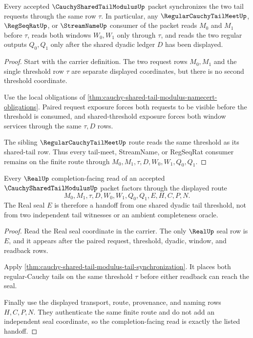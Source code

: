 \begin{theorem}
\label{thm:cauchy-shared-tail-modulus-tail-synchronization}
Every accepted $\CauchySharedTailModulusUp$ packet synchronizes the two tail requests through the same row $\tau$. In particular, any $\RegularCauchyTailMeetUp$, $\RegSeqRatUp$, or $\StreamNameUp$ consumer of the packet reads $M_0$ and $M_1$ before $\tau$, reads both windows $W_0,W_1$ only through $\tau$, and reads the two regular outputs $Q_0,Q_1$ only after the shared dyadic ledger $D$ has been displayed.
\end{theorem}
\begin{proof}
Start with the carrier definition. The two request rows $M_0,M_1$ and the single threshold row $\tau$ are separate displayed coordinates, but there is no second threshold coordinate.

Use the local obligations of \autoref{thm:cauchy-shared-tail-modulus-namecert-obligations}. Paired request exposure forces both requests to be visible before the threshold is consumed, and shared-threshold exposure forces both window services through the same $\tau,D$ rows.

The sibling $\RegularCauchyTailMeetUp$ route reads the same threshold as its shared-tail row. Thus every tail-meet, StreamName, or RegSeqRat consumer remains on the finite route through $M_0,M_1,\tau,D,W_0,W_1,Q_0,Q_1$.
\end{proof}

\begin{theorem}
\label{thm:cauchy-shared-tail-modulus-real-seal-handoff}
Every $\RealUp$ completion-facing read of an accepted $\CauchySharedTailModulusUp$ packet factors through the displayed route
$$
M_0,M_1,\tau,D,W_0,W_1,Q_0,Q_1,E,H,C,P,N.
$$
The Real seal $E$ is therefore a handoff from one shared dyadic tail threshold, not from two independent tail witnesses or an ambient completeness oracle.
\end{theorem}
\begin{proof}
Read the Real seal coordinate in the carrier. The only $\RealUp$ seal row is $E$, and it appears after the paired request, threshold, dyadic, window, and readback rows.

Apply \autoref{thm:cauchy-shared-tail-modulus-tail-synchronization}. It places both regular-Cauchy tails on the same threshold $\tau$ before either readback can reach the seal.

Finally use the displayed transport, route, provenance, and naming rows $H,C,P,N$. They authenticate the same finite route and do not add an independent seal coordinate, so the completion-facing read is exactly the listed handoff.
\end{proof}

